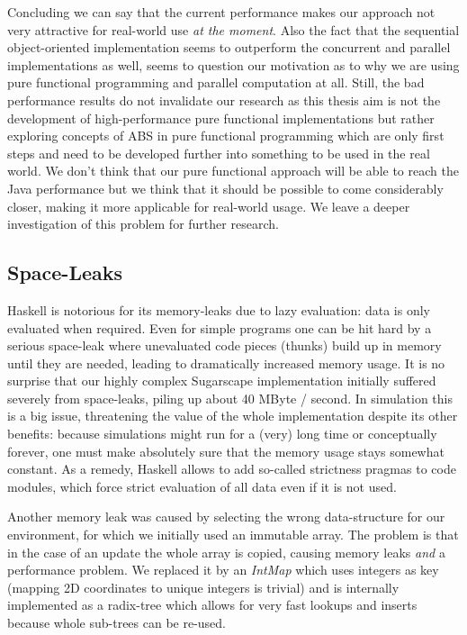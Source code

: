 Concluding we can say that the current performance makes our approach not very attractive for real-world use \textit{at the moment}. Also the fact that the sequential object-oriented implementation seems to outperform the concurrent and parallel implementations as well, seems to question our motivation as to why we are using pure functional programming and parallel computation at all. Still, the bad performance results do not invalidate our research as this thesis aim is not the development of high-performance pure functional implementations but rather exploring concepts of ABS in pure functional programming which are only first steps and need to be developed further into something to be used in the real world. We don't think that our pure functional approach will be able to reach the Java performance but we think that it should be possible to come considerably closer, making it more applicable for real-world usage. We leave a deeper investigation of this problem for further research.

\subsection{Space-Leaks}
Haskell is notorious for its memory-leaks due to lazy evaluation: data is only evaluated when required. Even for simple programs one can be hit hard by a serious space-leak where unevaluated code pieces (thunks) build up in memory until they are needed, leading to dramatically increased memory usage. It is no surprise that our highly complex Sugarscape implementation initially suffered severely from space-leaks, piling up about 40 MByte / second. In simulation this is a big issue, threatening the value of the whole implementation despite its other benefits: because simulations might run for a (very) long time or conceptually forever, one must make absolutely sure that the memory usage stays somewhat constant. As a remedy, Haskell allows to add so-called strictness pragmas to code modules, which force strict evaluation of all data even if it is not used. %

Another memory leak was caused by selecting the wrong data-structure for our environment, for which we initially used an immutable array. The problem is that in the case of an update the whole array is copied, causing memory leaks \textit{and} a performance problem. We replaced it by an \textit{IntMap} which uses integers as key (mapping 2D coordinates to unique integers is trivial) and is internally implemented as a radix-tree which allows for very fast lookups and inserts because whole sub-trees can be re-used.


